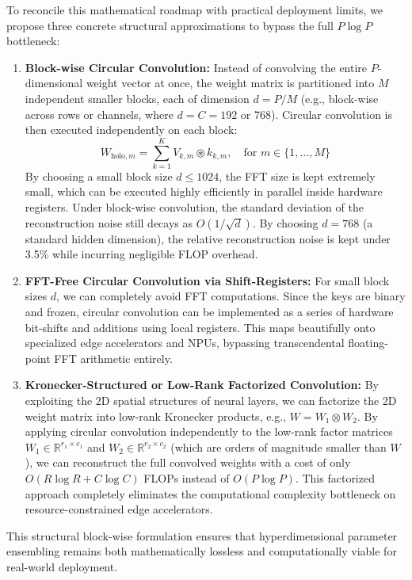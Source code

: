 \documentclass{article}
\theoremstyle{plain}
\theoremstyle{definition}
\theoremstyle{remark}
\begin{document}
To reconcile this mathematical roadmap with practical deployment limits, we propose three concrete structural approximations to bypass the full $P \log P$ bottleneck:
\begin{enumerate}
\item \textbf{Block-wise Circular Convolution:} Instead of convolving the entire $P$-dimensional weight vector at once, the weight matrix is partitioned into $M$ independent smaller blocks, each of dimension $d = P / M$ (e.g., block-wise across rows or channels, where $d = C = 192$ or $768$). Circular convolution is then executed independently on each block:
\begin{equation}
W_{\text{holo}, m} = \sum_{k=1}^K V_{k, m} \circledast k_{k, m}, \quad \text{for } m \in \{1, \dots, M\}
\end{equation}
By choosing a small block size $d \leq 1024$, the FFT size is kept extremely small, which can be executed highly efficiently in parallel inside hardware registers. Under block-wise convolution, the standard deviation of the reconstruction noise still decays as $O(1/\sqrt{d})$. By choosing $d = 768$ (a standard hidden dimension), the relative reconstruction noise is kept under 3.5\% while incurring negligible FLOP overhead.
\item \textbf{FFT-Free Circular Convolution via Shift-Registers:} For small block sizes $d$, we can completely avoid FFT computations. Since the keys are binary and frozen, circular convolution can be implemented as a series of hardware bit-shifts and additions using local registers. This maps beautifully onto specialized edge accelerators and NPUs, bypassing transcendental floating-point FFT arithmetic entirely.
\item \textbf{Kronecker-Structured or Low-Rank Factorized Convolution:} By exploiting the 2D spatial structures of neural layers, we can factorize the 2D weight matrix into low-rank Kronecker products, e.g., $W = W_1 \otimes W_2$. By applying circular convolution independently to the low-rank factor matrices $W_1 \in \mathbb{R}^{r_1 \times c_1}$ and $W_2 \in \mathbb{R}^{r_2 \times c_2}$ (which are orders of magnitude smaller than $W$), we can reconstruct the full convolved weights with a cost of only $O(R \log R + C \log C)$ FLOPs instead of $O(P \log P)$. This factorized approach completely eliminates the computational complexity bottleneck on resource-constrained edge accelerators.
\end{enumerate}
This structural block-wise formulation ensures that hyperdimensional parameter ensembling remains both mathematically lossless and computationally viable for real-world deployment.
\end{document}
